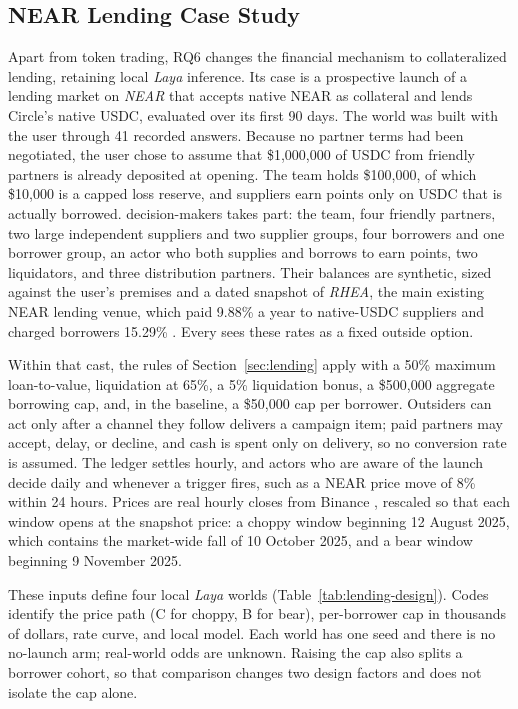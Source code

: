 \subsection{NEAR Lending Case Study}\label{sec:eval-lending}
Apart from token trading, RQ6 changes the financial mechanism to collateralized
lending, retaining local \textit{Laya} inference. Its case
is a prospective launch of a lending market on \textit{NEAR} that accepts
native NEAR as collateral and lends Circle's native USDC, evaluated over its
first 90 days. The world was built with the user through 41 recorded answers.
Because no partner terms had been negotiated, the user chose to assume that
\$1{,}000{,}000 of USDC from friendly partners is already deposited at
opening. The team holds \$100{,}000, of which \$10{,}000 is a capped loss
reserve, and suppliers earn points only on USDC that is actually borrowed.
 decision-makers takes part: the team, four friendly partners, two large
independent suppliers and two supplier groups, four borrowers and one
borrower group, an actor who both supplies and borrows to earn points,
two liquidators, and three distribution partners. Their balances are
synthetic, sized against the user's premises and a dated snapshot of
\textit{RHEA}, the main existing NEAR lending venue, which paid 9.88\% a year to
native-USDC suppliers and charged borrowers 15.29\% \cite{rhealending}. Every
 sees these rates as a fixed outside option.

Within that cast, the rules of Section~\ref{sec:lending} apply with a 50\%
maximum loan-to-value, liquidation at 65\%, a 5\% liquidation bonus, a
\$500{,}000 aggregate borrowing cap, and, in the baseline, a \$50{,}000 cap per
borrower. Outsiders  can act only after a  channel they follow delivers a
campaign item; paid partners may accept, delay, or decline, and cash is spent
only on delivery, so no conversion rate is assumed. The ledger settles hourly,
and actors who are aware of the launch decide daily and whenever a trigger
fires, such as a NEAR price move of 8\% within 24 hours. Prices are real
hourly closes from Binance \cite{binanceklines}, rescaled so that each window
opens at the snapshot price: a choppy window beginning 12 August 2025, which
contains the market-wide fall of 10 October 2025, and a bear window beginning
9 November 2025.

These inputs define four local \textit{Laya} worlds
(Table~\ref{tab:lending-design}). Codes identify the price path (C for choppy,
B for bear), per-borrower cap in thousands of dollars, rate curve, and local
model. Each world has one seed and there is no no-launch arm; real-world odds
are unknown. Raising the cap also splits a borrower cohort, so that comparison
changes two design factors and does not isolate the cap alone.

